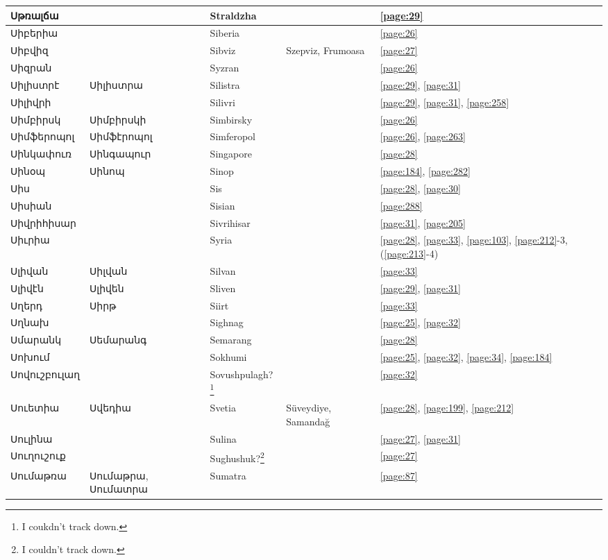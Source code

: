 \begin{center}
\begin{longtable}{|p{}|p{3cm}|p{3cm}|p{2cm}|p{3cm}|}
Սթռալճա& & Straldzha& &\ref{page:29}\\ \hline
Սիբերիա& &Siberia & &\ref{page:26}\\ \hline
Սիբվիզ& &Sibviz &Szepviz, Frumoasa &\ref{page:27}\\ \hline
Սիզրան& & Syzran& &\ref{page:26}\\ \hline
Սիլիստրէ&Սիլիստրա & Silistra& &\ref{page:29}, \ref{page:31}\\ \hline
Սիլիվրի& & Silivri& &\ref{page:29}, \ref{page:31}, \ref{page:258}\\ \hline
Սիմբիրսկ&Սիմբիրսկի &Simbirsky & &\ref{page:26}\\ \hline
Սիմֆերոպոլ& Սիմֆէրոպոլ&Simferopol & &\ref{page:26}, \ref{page:263}\\ \hline
Սինկափուռ&Սինգապուր & Singapore& &\ref{page:28}\\ \hline
Սինօպ& Սինոպ&Sinop & &\ref{page:184}, \ref{page:282}\\ \hline
Սիս& &Sis & &\ref{page:28}, \ref{page:30}\\ \hline
Սիսիան& &Sisian & &\ref{page:288}\\ \hline
Սիվրիհիսար& & Sivrihisar& &\ref{page:31}, \ref{page:205}\\ \hline
Սիւրիա& &Syria &  &\ref{page:28}, \ref{page:33}, \ref{page:103}, \ref{page:212}-3, (\ref{page:213}-4)\\ \hline
Սլիվան& Սիլվան&Silvan & &\ref{page:33}\\ \hline
Սլիվէն&   Սլիվեն &Sliven & &\ref{page:29}, \ref{page:31}\\ \hline
Սղերդ& Սիրթ& Siirt& &\ref{page:33}\\ \hline
Սղնախ& & Sighnag& &\ref{page:25}, \ref{page:32}\\ \hline
Սմարանկ& Սեմարանգ& Semarang& &\ref{page:28}\\ \hline
Սոխում& & Sokhumi& &\ref{page:25}, \ref{page:32}, \ref{page:34}, \ref{page:184}\\ \hline
Սովուշբուլաղ& &Sovushpulagh?\footnote{I coukdn't track down.} & &\ref{page:32}\\ \hline
Սուետիա& Սվեդիա& Svetia  &Süveydiye, Samandağ&\ref{page:28}, \ref{page:199}, \ref{page:212}\\ \hline
Սուլինա& & Sulina& &\ref{page:27}, \ref{page:31}\\ \hline
Սուղուշուք& &Sughushuk?\footnote{I couldn't track down.} & &\ref{page:27}\\ \hline
Սումաթռա& Սումաթրա, Սումատրա & Sumatra   & &\ref{page:87}\\ \hline

\end{longtable}
\end{center}
